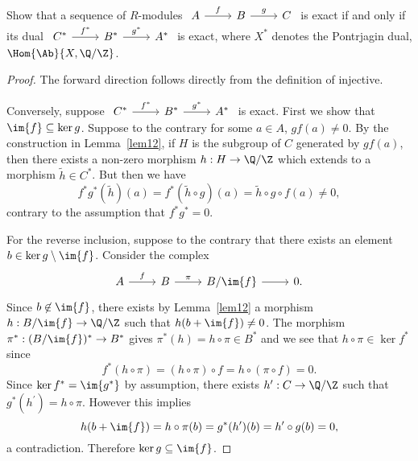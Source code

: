 \documentclass[10pt]{amsart}
\begin{document}
\begin{ex}
  Show that a sequence of $R$-modules
  $\begin{tikzcd} A \arrow{r}{f} & B \arrow{r}{g} & C \end{tikzcd}$
  is exact if and only if its dual
  $\begin{tikzcd} C^* \arrow{r}{f^*} & B^* \arrow{r}{g^*} & A^* \end{tikzcd}$
  is exact, where $X^*$ denotes the Pontrjagin dual, $\Hom{\Ab}{X, \Q/\Z}$.

  \begin{proof}
    The forward direction follows directly from the definition of injective.

    Conversely, suppose
    $\begin{tikzcd} C^* \arrow{r}{f^*} & B^* \arrow{r}{g^*} & A^* \end{tikzcd}$
    is exact.
    First we show that $\im{f} \subseteq \ker{g}$.
    Suppose to the contrary for some $a \in A$, $gf(a) \neq 0$.
    By the construction in Lemma~\ref{lem12}, if $H$ is the subgroup of $C$ generated by $gf(a)$, then there exists a non-zero morphism $h : H \rightarrow \Q/\Z$ which extends to a morphism $\tilde{h} \in C^*$.
    But then we have
    $$f^*g^*(\tilde{h})(a) = f^*(\tilde{h} \circ g)(a) = \tilde{h} \circ g \circ f(a) \neq 0,$$
    contrary to the assumption that $f^*g^* = 0$.

    For the reverse inclusion, suppose to the contrary that there exists an element $b \in \ker{g}\setminus\im{f}$.
    Consider the complex
    $$\begin{tikzcd}
      A \arrow{r}{f} & B \arrow{r}{\pi} & B/\im{f} \arrow{r} & 0.
    \end{tikzcd}$$
    Since $b \not \in \im{f}$, there exists by Lemma~\ref{lem12} a morphism $h : B/\im{f} \rightarrow \Q/\Z$ such that $h(b + \im{f}) \neq 0$.
    The morphism $\pi^* : (B/\im{f})^* \rightarrow B^*$  gives $\pi^*(h) = h \circ \pi \in B^*$ and we see that $h \circ \pi \in \ker{f^*}$ since
    $$f^*(h \circ \pi) = (h \circ \pi) \circ f = h \circ (\pi \circ f) = 0.$$
    Since $\ker{f^*} = \im{g^*}$ by assumption, there exists $h^\prime : C \rightarrow \Q/\Z$ such that $g^*(h^\prime) = h \circ \pi$.
    However this implies
    $$h(b + \im{f}) = h \circ \pi(b) = g^*(h^\prime)(b) = h^\prime \circ g(b) = 0,$$
    a contradiction.
    Therefore $\ker{g} \subseteq \im{f}$.
  \end{proof}
\end{ex}
\end{document}
